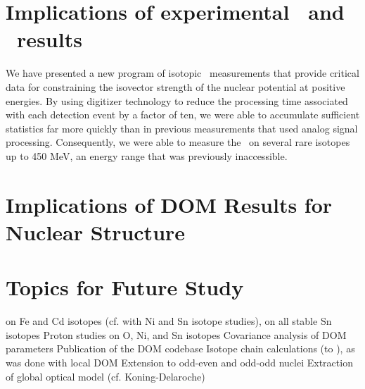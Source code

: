\section{Implications of experimental \tot\ and \el\ results}
We have presented a new program of isotopic \tot\ measurements that provide critical data for
constraining the isovector strength of the nuclear potential at positive energies. By using
digitizer technology to reduce the processing time associated with each detection event by a factor
of ten, we were able to accumulate sufficient statistics far more quickly than in previous
measurements that used analog signal processing. Consequently, we were able to measure the \tot\ on
several rare isotopes up to 450 MeV, an energy range that was previously inaccessible.

\section{Implications of DOM Results for Nuclear Structure}

\section{Topics for Future Study}
\tot on Fe and Cd isotopes (cf. with Ni and Sn isotope studies), \tot on all stable Sn isotopes
Proton \rxn studies on O, Ni, and Sn isotopes
Covariance analysis of DOM parameters
Publication of the DOM codebase
Isotope chain calculations (\snTwelve to \snFour), as was done with local DOM
Extension to odd-even and odd-odd nuclei
Extraction of global optical model (cf. Koning-Delaroche)
